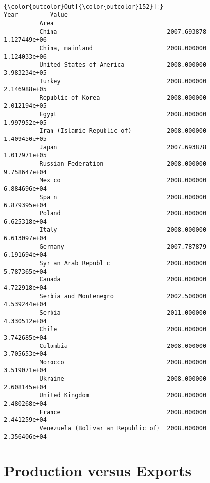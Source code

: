 \documentclass[11pt]{article}
\begin{document}
    \begin{center}
    \end{center}
    { \hspace*{\fill} \\}
    
\begin{Verbatim}[commandchars=\\\{\}]
{\color{outcolor}Out[{\color{outcolor}152}]:}                                            Year         Value
          Area                                                         
          China                               2007.693878  1.127449e+06
          China, mainland                     2008.000000  1.124033e+06
          United States of America            2008.000000  3.983234e+05
          Turkey                              2008.000000  2.146988e+05
          Republic of Korea                   2008.000000  2.012194e+05
          Egypt                               2008.000000  1.997952e+05
          Iran (Islamic Republic of)          2008.000000  1.409450e+05
          Japan                               2007.693878  1.017971e+05
          Russian Federation                  2008.000000  9.758647e+04
          Mexico                              2008.000000  6.884696e+04
          Spain                               2008.000000  6.879395e+04
          Poland                              2008.000000  6.625318e+04
          Italy                               2008.000000  6.613097e+04
          Germany                             2007.787879  6.191694e+04
          Syrian Arab Republic                2008.000000  5.787365e+04
          Canada                              2008.000000  4.722918e+04
          Serbia and Montenegro               2002.500000  4.539244e+04
          Serbia                              2011.000000  4.330512e+04
          Chile                               2008.000000  3.742685e+04
          Colombia                            2008.000000  3.705653e+04
          Morocco                             2008.000000  3.519071e+04
          Ukraine                             2008.000000  2.608145e+04
          United Kingdom                      2008.000000  2.480268e+04
          France                              2008.000000  2.441259e+04
          Venezuela (Bolivarian Republic of)  2008.000000  2.356406e+04
\end{Verbatim}
            
    \section{Production versus Exports}\label{production-versus-exports}
\end{document}
